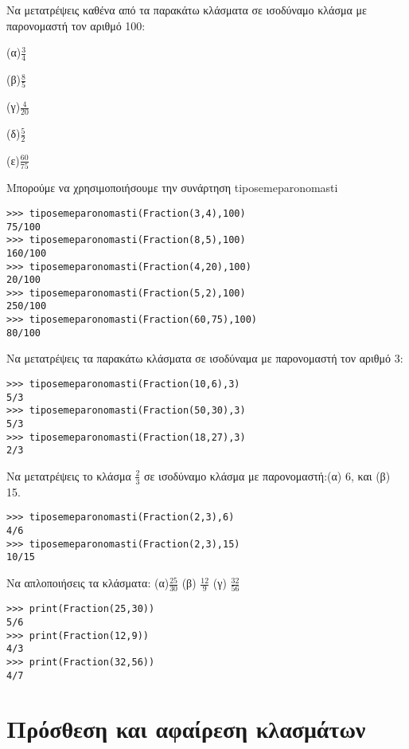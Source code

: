 \begin{exercise}
Να μετατρέψεις καθένα από τα παρακάτω κλάσματα σε ισοδύναμο κλάσμα με παρονομαστή  τον αριθμό 100: 

(α)$\frac{3}{4}$ 

(β)$\frac{8}{5}$ 

(γ)$\frac{4}{20}$ 

(δ)$\frac{5}{2}$ 

(ε)$\frac{60}{75}$

\end{exercise}

Μπορούμε να χρησιμοποιήσουμε την συνάρτηση tiposemeparonomasti
\begin{lstlisting}
>>> tiposemeparonomasti(Fraction(3,4),100)
75/100
>>> tiposemeparonomasti(Fraction(8,5),100)
160/100
>>> tiposemeparonomasti(Fraction(4,20),100)
20/100
>>> tiposemeparonomasti(Fraction(5,2),100)
250/100
>>> tiposemeparonomasti(Fraction(60,75),100)
80/100
\end{lstlisting}

\begin{exercise}Να μετατρέψεις τα παρακάτω κλάσματα σε ισοδύναμα με παρονομαστή τον αριθμό 3:\end{exercise}

\begin{lstlisting}
>>> tiposemeparonomasti(Fraction(10,6),3)
5/3
>>> tiposemeparonomasti(Fraction(50,30),3)
5/3
>>> tiposemeparonomasti(Fraction(18,27),3)
2/3
\end{lstlisting}

\begin{exercise}
Να μετατρέψεις το κλάσμα $\frac{2}{3}$ σε ισοδύναμο κλάσμα με παρονομαστή:(α) 6, και (β) 15.
\end{exercise}

\begin{lstlisting}
>>> tiposemeparonomasti(Fraction(2,3),6)
4/6
>>> tiposemeparonomasti(Fraction(2,3),15)
10/15
\end{lstlisting}

\begin{exercise}
Να απλοποιήσεις τα κλάσματα: (α)$\frac{25}{30}$ (β) $\frac{12}{9}$ (γ) $\frac{32}{56}$
\end{exercise}

\begin{lstlisting}
>>> print(Fraction(25,30))
5/6
>>> print(Fraction(12,9))
4/3
>>> print(Fraction(32,56))
4/7
\end{lstlisting}

\section{Πρόσθεση και αφαίρεση κλασμάτων}

